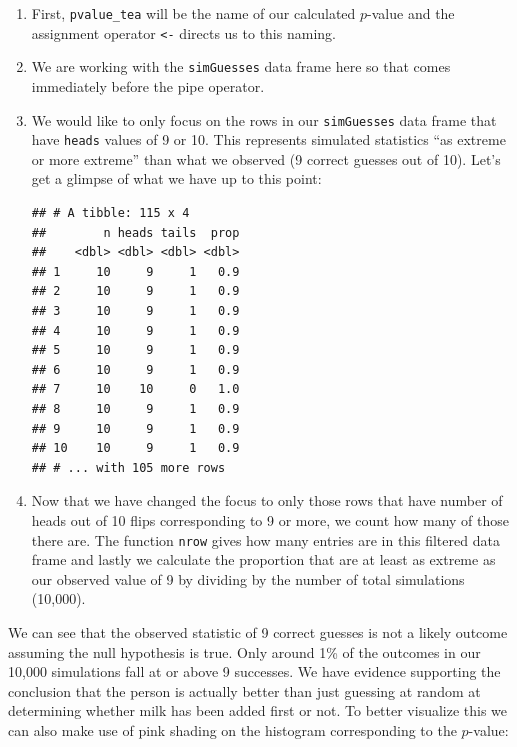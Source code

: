 \documentclass[]{tufte-book}
\newenvironment{Shaded}{\begin{snugshade}}{\end{snugshade}}
\newcommand{\KeywordTok}[1]{\textcolor[rgb]{0.13,0.29,0.53}{\textbf{{#1}}}}
\newcommand{\DecValTok}[1]{\textcolor[rgb]{0.00,0.00,0.81}{{#1}}}
\newcommand{\StringTok}[1]{\textcolor[rgb]{0.31,0.60,0.02}{{#1}}}
\newcommand{\NormalTok}[1]{{#1}}
\begin{document}
\begin{enumerate}
\def\labelenumi{\arabic{enumi}.}
\item
  First, \texttt{pvalue\_tea} will be the name of our calculated
  \(p\)-value and the assignment operator \texttt{\textless{}-} directs
  us to this naming.
\item
  We are working with the \texttt{simGuesses} data frame here so that
  comes immediately before the pipe operator.
\item
  We would like to only focus on the rows in our \texttt{simGuesses}
  data frame that have \texttt{heads} values of 9 or 10. This represents
  simulated statistics ``as extreme or more extreme'' than what we
  observed (9 correct guesses out of 10). Let's get a glimpse of what we
  have up to this point:

\begin{Shaded}
\end{Shaded}

\begin{verbatim}
## # A tibble: 115 x 4
##        n heads tails  prop
##    <dbl> <dbl> <dbl> <dbl>
## 1     10     9     1   0.9
## 2     10     9     1   0.9
## 3     10     9     1   0.9
## 4     10     9     1   0.9
## 5     10     9     1   0.9
## 6     10     9     1   0.9
## 7     10    10     0   1.0
## 8     10     9     1   0.9
## 9     10     9     1   0.9
## 10    10     9     1   0.9
## # ... with 105 more rows
\end{verbatim}
\item
  Now that we have changed the focus to only those rows that have number
  of heads out of 10 flips corresponding to 9 or more, we count how many
  of those there are. The function \texttt{nrow} gives how many entries
  are in this filtered data frame and lastly we calculate the proportion
  that are at least as extreme as our observed value of 9 by dividing by
  the number of total simulations (10,000).
\end{enumerate}

We can see that the observed statistic of 9 correct guesses is not a
likely outcome assuming the null hypothesis is true. Only around 1\% of
the outcomes in our 10,000 simulations fall at or above 9 successes. We
have evidence supporting the conclusion that the person is actually
better than just guessing at random at determining whether milk has been
added first or not. To better visualize this we can also make use of
pink shading on the histogram corresponding to the \(p\)-value:
\end{document}
